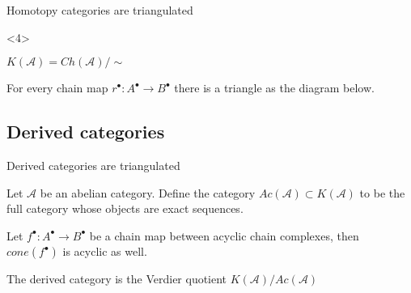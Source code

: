 \documentclass{beamer}
\newcommand{\chain}[1]{#1^{\bullet}}
\begin{document}
\begin{frame}{Homotopy categories are triangulated}
\begin{onlyenv}
                \end{onlyenv}
                \begin{onlyenv}<4>
                    \begin{definition}
                        $K(\mathcal{A})=Ch(\mathcal{A})/\sim$
                    \end{definition}
                    \begin{lemma}
                        For every chain map $\chain{r}:\chain{A}\rightarrow\chain{B}$ there is a triangle as the diagram below.
                        \begin{center}
                        \end{center}
                    \end{lemma}
                \end{onlyenv}
            \end{frame}
        \subsection{Derived categories}
            \begin{frame}{Derived categories are triangulated}
                \begin{definition}
                    Let $\mathcal{A}$ be an abelian category. Define the category $Ac(\mathcal{A})\subset K(\mathcal{A})$ to be the full category whose objects are exact sequences.
                \end{definition}
                \begin{lemma}
                    Let $\chain{f}:\chain{A}\rightarrow\chain{B}$ be a chain map between acyclic chain complexes, then $cone(\chain{f})$ is acyclic as well.
                \end{lemma}
                \begin{theorem}
                    The derived category is the Verdier quotient $K(\mathcal{A})/Ac(\mathcal{A})$
                \end{theorem}
            \end{frame}
\end{document}
